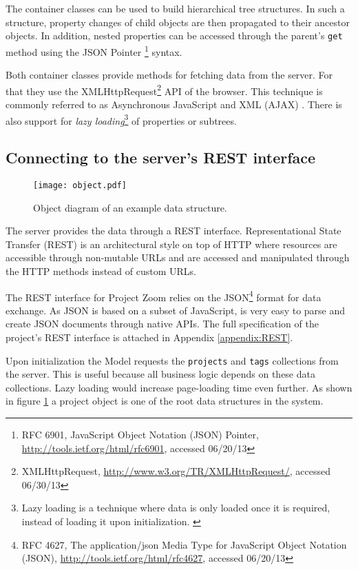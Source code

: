 The container classes can be used to build hierarchical tree structures. In such a structure, property changes of child objects are then propagated to their ancestor objects. In addition, nested properties can be accessed through the parent's \texttt{get} method using the JSON Pointer \footnote{RFC 6901, JavaScript Object Notation (JSON) Pointer, \url{http://tools.ietf.org/html/rfc6901}, accessed 06/20/13} syntax.

Both container classes provide methods for fetching data from the server. For that they use the XMLHttpRequest\footnote{XMLHttpRequest, \url{http://www.w3.org/TR/XMLHttpRequest/}, accessed 06/30/13} API of the browser. This technique is commonly referred to as Asynchronous JavaScript and XML (AJAX) \cite{Garrett_2005}. There is also support for \textit{lazy loading}\footnote{Lazy loading is a technique where data is only loaded once it is required, instead of loading it upon initialization. \cite{Fowler_2002}} of properties or subtrees. 


\subsection{Connecting to the server's REST interface}

\begin{figure}
\centering
\texttt{[image: object.pdf]}
\caption{Object diagram of an example data structure.}
\label{fig:projectstruc}
\end{figure}

The server provides the data through a REST interface. Representational State Transfer (REST) is an architectural style on top of HTTP where resources are accessible through non-mutable URLs and are accessed and manipulated through the HTTP methods instead of custom URLs. \cite{Fielding_2000} 

The REST interface for Project Zoom relies on the JSON\footnote{RFC 4627,  The application/json Media Type for JavaScript Object Notation (JSON), \url{http://tools.ietf.org/html/rfc4627}, accessed 06/20/13} format for data exchange. As JSON is based on a subset of JavaScript, is very easy to parse and create JSON documents through native APIs. The full specification of the project's REST interface is attached in Appendix \ref{appendix:REST}.

Upon initialization the Model requests the \texttt{projects} and \texttt{tags} collections from the server. This is useful because all business logic depends on these data collections. Lazy loading would increase page-loading time even further. As shown in figure \ref{fig:projectstruc} a project object is one of the root data structures in the system.


